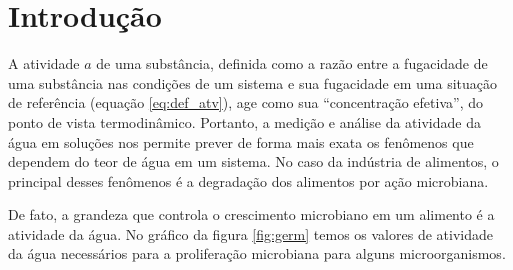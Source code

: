 \documentclass[
	12pt,				%
	openright,
	twoside,
	a4paper,			%
	english,			%
	french,				%
	spanish,			%
	brazil				%
	]{abntex2}
\begin{document}
\tableofcontents*
\cleardoublepage

\textual

\chapter{Introdução}

A atividade $a$ de uma substância, definida\cite{sandler2017} como
a razão entre a fugacidade de uma substância nas condições de um sistema
e sua fugacidade em uma situação de referência (equação \ref{eq:def_atv}),
age como sua ``concentração efetiva'', do ponto de vista termodinâmico.
Portanto, a medição e análise da atividade da água em soluções nos permite
prever de forma mais exata os fenômenos que dependem do teor de água em
um sistema. No caso da indústria de alimentos, o principal desses fenômenos
é a degradação dos alimentos por ação microbiana.

De fato, a grandeza que controla o crescimento microbiano em um alimento é a
atividade da água. No gráfico da figura \ref{fig:germ} temos os valores de atividade da
água necessários para a proliferação microbiana para alguns microorganismos.
\end{document}
